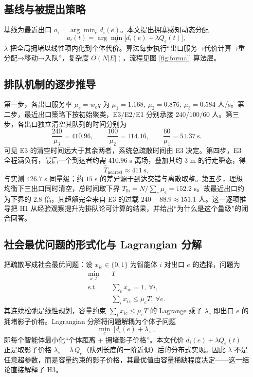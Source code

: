 ﻿\documentclass[withoutpreface,bwprint]{cumcmthesis}
\begin{document}
\subsection{基线与被提出策略}
基线为最近出口 $a_i=\arg\min_e d_i(e)$。本文提出拥塞感知动态分配
\begin{equation}
a_i(t)=\arg\min_e \bigl[d_i(e)+\lambda Q_e(t)\bigr],
\label{eq:cong}
\end{equation}
$\lambda$ 把全局拥堵以线性项内化到个体代价。算法每步执行“出口服务→代价计算→重分配→移动→入队”，复杂度 $O(N|E|)$，流程见图 \ref{fig:formal} 算法层。

\subsection{排队机制的逐步推导}
第一步，各出口服务率 $\mu_e=w_eq$ 为 $\mu_1=1.168,\ \mu_2=0.876,\ \mu_3=0.584$ 人/s。第二步，最近出口策略下按初始聚类，E3/E2/E1 分别承接 $240/100/60$ 人。第三步，各出口独立清空其队列的时间分别为
\begin{equation}
\frac{240}{\mu_3}=410.96,\qquad \frac{100}{\mu_2}=114.16,\qquad \frac{60}{\mu_1}=51.37\ \text{s}.
\end{equation}
可见 E3 的清空时间远大于其余两者，系统总疏散时间由 E3 决定。第四步，E3 全程满负荷，最后一个到达者约需 $410.96$ s 离场，叠加其约 $3$ m 的行走瞬态，得
\begin{equation}
\widehat T_{\text{nearest}}\approx411\ \text{s},
\end{equation}
与实测 $426.7$ s 同量级；约 $15$ s 的差异源于到达交错与离散取整。第五步，理想均衡下三出口同时清空，总时间取下界 $T_{\mathrm{lb}}=N/\sum_e\mu_e=152.2$ s。故最近出口约为下界的 $2.8$ 倍，其超额完全来自 E3 的过载 $240-88.9\approx151.1$ 人。这一逐项推导把 H1 从经验观察提升为排队论可计算的结果，并给出“为什么是这个量级”的闭合回答。

\subsection{社会最优问题的形式化与 Lagrangian 分解}
把疏散写成社会最优问题：设 $x_{ie}\in\{0,1\}$ 为智能体 $i$ 对出口 $e$ 的选择，问题为
\begin{equation}
\begin{aligned}
\min_{x,T}\quad & T\\
\mathrm{s.t.}\quad & \sum_{e}x_{ie}=1,\ \forall i,\\
& \sum_{i}x_{ie}\le \mu_e T,\ \forall e.
\end{aligned}
\label{eq:social}
\end{equation}
其连续松弛是线性规划，容量约束 $\sum_i x_{ie}\le\mu_e T$ 的 Lagrange 乘子 $\lambda_e$ 即出口 $e$ 的拥堵影子价格。Lagrangian 分解将问题解耦为个体子问题
\begin{equation}
\min_{e}\ \bigl[d_i(e)+\lambda_e\bigr],
\end{equation}
即每个智能体最小化“个体距离 + 拥堵影子价格”。本文代价 $d_i(e)+\lambda Q_e(t)$ 正是取影子价格 $\lambda_e=\lambda\,Q_e$（队列长度的一阶近似）后的分布式实现。因此 $\lambda$ 不是任意超参数，而是容量约束的影子价格，其最优值由容量稀缺程度决定——这一结论直接解释了 H3。
\end{document}

